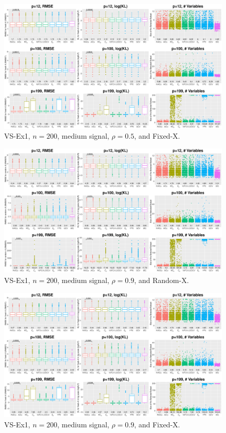 \begin{figure}[!ht]
\centering
\includegraphics[width=\textwidth]{figures/supplement/fixedx_VS-Ex1_n200_msnr_rho05.eps}
\caption{VS-Ex1, $n=200$, medium signal, $\rho=0.5$, and Fixed-X.}
\end{figure}
\clearpage
\begin{figure}[!ht]
\centering
\includegraphics[width=\textwidth]{figures/supplement/randomx_VS-Ex1_n200_msnr_rho09.eps}
\caption{VS-Ex1, $n=200$, medium signal, $\rho=0.9$, and Random-X.}
\end{figure}
\begin{figure}[!ht]
\centering
\includegraphics[width=\textwidth]{figures/supplement/fixedx_VS-Ex1_n200_msnr_rho09.eps}
\caption{VS-Ex1, $n=200$, medium signal, $\rho=0.9$, and Fixed-X.}
\end{figure}
